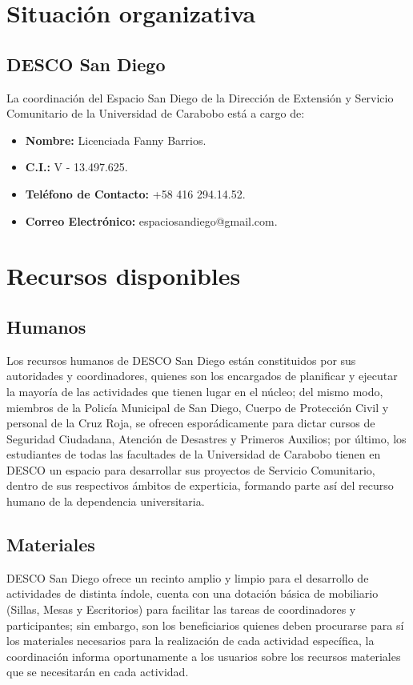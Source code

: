 \documentclass[11pt, a4paper, twosides]{report}
\begin{document}
\section{Situación organizativa}
\subsection{DESCO San Diego}
La coordinación del Espacio San Diego de la Dirección de Extensión y Servicio Comunitario de la Universidad de Carabobo está a cargo de:

\begin{itemize}
	\item \textbf{Nombre:} Licenciada Fanny Barrios.
	\item \textbf{C.I.:} V - 13.497.625.
	\item \textbf{Teléfono de Contacto:} +58 416 294.14.52.
	\item \textbf{Correo Electrónico:} espaciosandiego@gmail.com.
\end{itemize}

\section{Recursos disponibles}

\subsection{Humanos}
Los recursos humanos de DESCO San Diego están constituidos por sus autoridades y coordinadores, quienes son los encargados de planificar y ejecutar la mayoría de las actividades que tienen lugar en el núcleo; del mismo modo, miembros de la Policía Municipal de San Diego, Cuerpo de Protección Civil y personal de la Cruz Roja, se ofrecen esporádicamente para dictar cursos de Seguridad Ciudadana, Atención de Desastres y Primeros Auxilios; por último, los estudiantes de todas las facultades de la Universidad de Carabobo tienen en DESCO un espacio para desarrollar sus proyectos de Servicio Comunitario, dentro de sus respectivos ámbitos de experticia, formando parte así del recurso humano de la dependencia universitaria.

\subsection{Materiales}
DESCO San Diego ofrece un recinto amplio y limpio para el desarrollo de actividades de distinta índole, cuenta con una dotación básica de mobiliario (Sillas, Mesas y Escritorios) para facilitar las tareas de coordinadores y participantes; sin embargo, son los beneficiarios quienes deben procurarse para sí los materiales necesarios para la realización de cada actividad específica, la coordinación informa oportunamente a los usuarios sobre los recursos materiales que se necesitarán en cada actividad.
\end{document}
